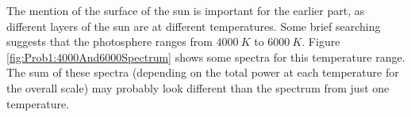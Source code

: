 \documentclass[../../PS3.tex]{subfiles}
\begin{document}
The mention of the surface of the sun is important for the earlier part, as different layers of the sun are at different temperatures. Some brief searching suggests that the photosphere ranges from $\SI{4000}{K}$ to $\SI{6000}{K}$. Figure \ref{fig:Prob1:4000And6000Spectrum} shows some spectra for this temperature range. The sum of these spectra (depending on the total power at each temperature for the overall scale) may probably look different than the spectrum from just one temperature.

\FloatBarrier

\FloatBarrier

\FloatBarrier

\FloatBarrier
\end{document}
